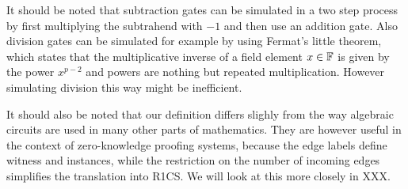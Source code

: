 It should be noted that subtraction gates can be simulated in a two step process by first multiplying the subtrahend with $-1$ and then use an addition gate. Also division gates can be simulated for example by using Fermat's little theorem, which states that the multiplicative inverse of a field element $x\in\mathbb{F}$ is given by the power $x^{p-2}$ and powers are nothing but repeated multiplication. However simulating division this way might be inefficient.

It should also be noted that our definition differs slighly from the way algebraic circuits are used in many other parts of mathematics. They are however useful in the context of zero-knowledge proofing systems, because the edge labels define witness and instances, while the restriction on the number of incoming edges simplifies the translation into R1CS. We will look at this more closely in XXX.


